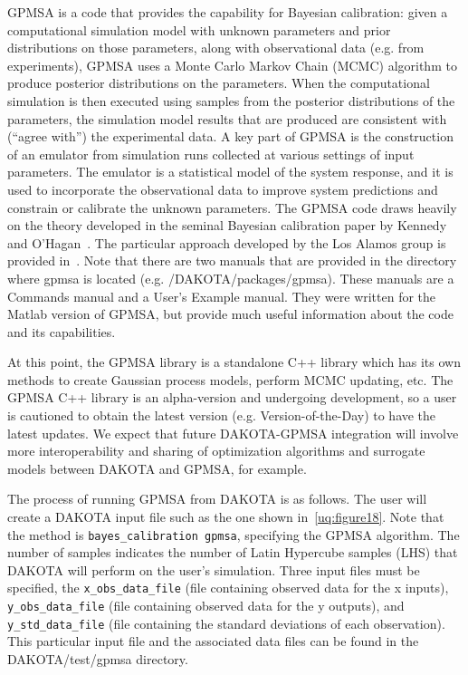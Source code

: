 GPMSA is a code that provides the capability for Bayesian calibration:  
given a computational simulation model with unknown parameters and 
prior distributions on those parameters, along with observational data 
(e.g. from experiments),  GPMSA uses a Monte Carlo Markov Chain (MCMC) 
algorithm to produce posterior distributions on the parameters.  
When the computational simulation is then executed using samples from 
the posterior distributions of the parameters, the simulation model results 
that are produced are consistent with (``agree with'') the experimental data.  
A key part of GPMSA is the construction of an emulator from simulation runs 
collected at various settings of input parameters.  The emulator is a 
statistical model of the system response, and it is used to incorporate 
the observational data to improve system predictions and constrain or 
calibrate the unknown parameters. The GPMSA code draws heavily 
on the theory developed in the seminal Bayesian calibration paper 
by Kennedy and O'Hagan~\cite{Kenn01}. The particular approach developed 
by the Los Alamos group is provided in~\cite{Hig08}.  Note that there are two 
manuals that are provided in the directory where gpmsa is located 
(e.g. /DAKOTA/packages/gpmsa).  These manuals are a Commands manual and 
a User's Example manual.  They were written for the Matlab version of 
GPMSA, but provide much useful information about the code and its 
capabilities.
 
At this point, the GPMSA library is a standalone C++ library which has 
its own methods to create Gaussian process models, perform MCMC updating, 
etc. The GPMSA C++ library is an alpha-version and undergoing development, 
so a user is cautioned to obtain the latest version (e.g. Version-of-the-Day)
to have the latest updates.  We expect that future DAKOTA-GPMSA integration 
will involve more interoperability and sharing of optimization 
algorithms and surrogate models between DAKOTA and GPMSA, for example. 

The process of running GPMSA from DAKOTA is as follows.  The user will create 
a DAKOTA input file such as the one shown in~\ref{uq:figure18}. 
Note that the method is \texttt{bayes\_calibration gpmsa}, 
specifying the GPMSA algorithm. The number of 
samples indicates the number of Latin Hypercube samples (LHS) that 
DAKOTA will perform on the user's simulation.  Three input files must be 
specified, the 
\texttt{x\_obs\_data\_file} 
(file containing observed data for the x inputs), 
\texttt{y\_obs\_data\_file} 
(file containing observed data for the y outputs), and 
\texttt{y\_std\_data\_file}
(file containing the standard deviations of each observation).   
This particular input file and the associated data files can be found in 
the DAKOTA/test/gpmsa directory.

